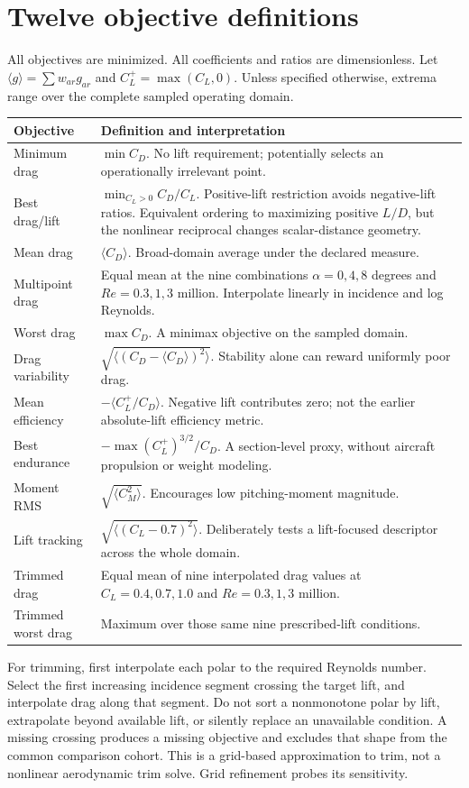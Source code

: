 \documentclass[11pt,a4paper]{article}
\begin{document}
\section{Twelve objective definitions}
All objectives are minimized. All coefficients and ratios are dimensionless. Let $\langle g\rangle=\sum w_{ar}g_{ar}$ and $C_L^+=\max(C_L,0)$. Unless specified otherwise, extrema range over the complete sampled operating domain.
\begin{longtable}{p{.28\linewidth}p{.65\linewidth}}
\toprule Objective & Definition and interpretation\\\midrule
Minimum drag & $\min C_D$. No lift requirement; potentially selects an operationally irrelevant point.\\
Best drag/lift & $\min_{C_L>0} C_D/C_L$. Positive-lift restriction avoids negative-lift ratios. Equivalent ordering to maximizing positive $L/D$, but the nonlinear reciprocal changes scalar-distance geometry.\\
Mean drag & $\langle C_D\rangle$. Broad-domain average under the declared measure.\\
Multipoint drag & Equal mean at the nine combinations $\alpha=0,4,8$ degrees and $Re=0.3,1,3$ million. Interpolate linearly in incidence and log Reynolds.\\
Worst drag & $\max C_D$. A minimax objective on the sampled domain.\\
Drag variability & $\sqrt{\langle(C_D-\langle C_D\rangle)^2\rangle}$. Stability alone can reward uniformly poor drag.\\
Mean efficiency & $-\langle C_L^+/C_D\rangle$. Negative lift contributes zero; not the earlier absolute-lift efficiency metric.\\
Best endurance & $-\max (C_L^+)^{3/2}/C_D$. A section-level proxy, without aircraft propulsion or weight modeling.\\
Moment RMS & $\sqrt{\langle C_M^2\rangle}$. Encourages low pitching-moment magnitude.\\
Lift tracking & $\sqrt{\langle(C_L-0.7)^2\rangle}$. Deliberately tests a lift-focused descriptor across the whole domain.\\
Trimmed drag & Equal mean of nine interpolated drag values at $C_L=0.4,0.7,1.0$ and $Re=0.3,1,3$ million.\\
Trimmed worst drag & Maximum over those same nine prescribed-lift conditions.\\\bottomrule
\end{longtable}
For trimming, first interpolate each polar to the required Reynolds number. Select the first increasing incidence segment crossing the target lift, and interpolate drag along that segment. Do not sort a nonmonotone polar by lift, extrapolate beyond available lift, or silently replace an unavailable condition. A missing crossing produces a missing objective and excludes that shape from the common comparison cohort. This is a grid-based approximation to trim, not a nonlinear aerodynamic trim solve. Grid refinement probes its sensitivity.
\end{document}
